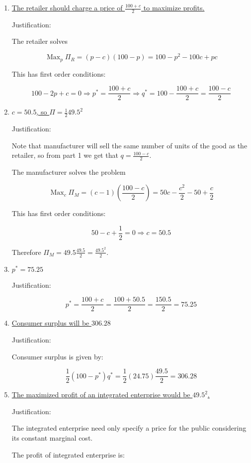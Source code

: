 \documentclass{article}
\DeclareMathOperator*{\Max}{Max}
\newenvironment{solution}{\color{red}}{\color{black}}
\begin{document}
\begin{solution}

\begin{enumerate}
\item\underline{The retailer should charge a price of $\frac{100+c}2$ to maximize profits.}

Justification:

The retailer solves

\[ \Max_p \Pi_R = (p-c)(100-p) = 100-p^2-100c+pc \]

This has first order conditions:

\[ 100-2p+c=0 \Rightarrow p^{*}=\frac{100+c}2 \Rightarrow q^{*}=100-\frac{100+c}2=\frac{100-c}2 \]

\item \underline{$c=50.5$, so $\Pi=\frac12 49.5^2$}

Justification:

Note that manufacturer will sell the same number of units of the good as the retailer, so from part 1 we get that $q=\frac{100-c}{2}$.

The manufacturer solves the problem 

\[ \Max_c \Pi_M = (c-1)(\frac{100-c}2)=50c-\frac{c^2}2-50+\frac{c}2 \]

This has first order conditions:

\[ 50-c+\frac12=0 \Rightarrow c=50.5 \]

Therefore $\Pi_M=49.5\frac{49.5}2=\frac{49.5^2}2$.

\item\underline{$p^{*}=75.25$}

Justification:

\[ p^{*}=\frac{100+c}2=\frac{100+50.5}2=\frac{150.5}2=75.25 \]

\item\underline{Consumer surplus will be $306.28$}

Justification:

Consumer surplus is given by:

\[ \frac12(100-p^{*})q^{*}=\frac12(24.75)\frac{49.5}2=306.28 \]

\item\underline{The maximized profit of an integrated enterprise would be $49.5^2$.}

Justification:

The integrated enterprise need only specify a price for the public considering its constant marginal cost.

The profit of integrated enterprise is:


\end{enumerate}
\end{solution}
\end{document}
